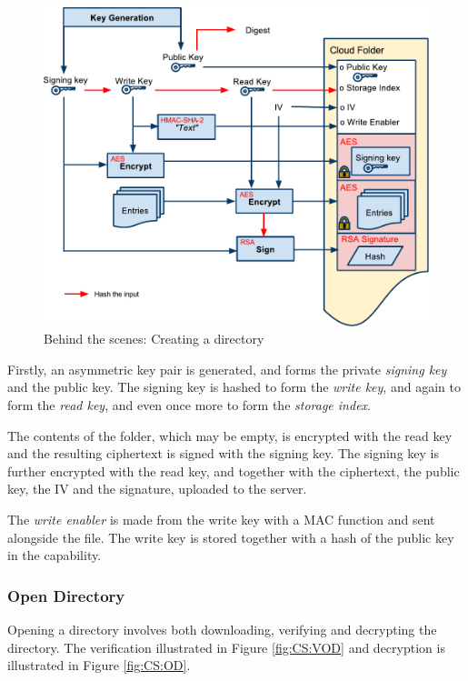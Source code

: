 \documentclass[pdftex,english,10pt,b5paper,twoside]{book}
\begin{document}
\begin{figure}[h!]
    \centering
        \includegraphics[width=\columnwidth]{CryptoCreateFolder.pdf}
	    \caption{Behind the scenes: Creating a directory}
    \label{fig:CS:CD}
\end{figure}

Firstly, an asymmetric key pair is generated, and forms the private
\emph{signing key} and the public key. The signing key is hashed to form the
\emph{write key}, and again to form the \emph{read key}, and even once more to
form the \emph{storage index}.

The contents of the folder, which may be empty, is encrypted with the read key
and the resulting ciphertext is signed with the signing key. The signing key is
further encrypted with the read key, and together with the ciphertext, the
public key, the \ac{IV} and the signature, uploaded to the server.

The \emph{write enabler} is made from the write key with a \ac{MAC} function
and sent alongside the file. The write key is stored together with a hash of
the public key in the capability.

\subsubsection{Open Directory}

Opening a directory involves both downloading, verifying and decrypting the
directory. The verification illustrated in Figure \ref{fig:CS:VOD} and
decryption is illustrated in Figure \ref{fig:CS:OD}.
\end{document}
